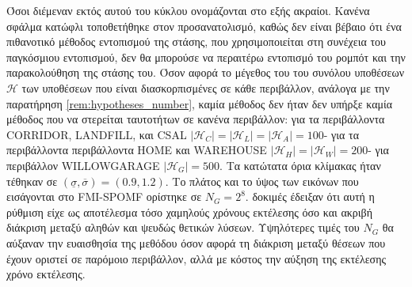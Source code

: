 Όσοι διέμεναν εκτός αυτού του κύκλου ονομάζονται στο εξής ακραίοι.  Κανένα σφάλμα
κατώφλι τοποθετήθηκε στον προσανατολισμό, καθώς δεν είναι βέβαιο ότι ένα πιθανοτικό
μέθοδος εντοπισμού της στάσης, που χρησιμοποιείται στη συνέχεια του παγκόσμιου εντοπισμού, δεν θα μπορούσε να
περαιτέρω εντοπισμό του ρομπότ και την παρακολούθηση της στάσης του.  Όσον αφορά το μέγεθος του
του συνόλου υποθέσεων $\mathcal{H}$ των υποθέσεων που είναι διασκορπισμένες σε κάθε
περιβάλλον, ανάλογα με την παρατήρηση \ref{rem:hypotheses_number}, καμία μέθοδος δεν ήταν
δεν υπήρξε καμία μέθοδος που να στερείται ταυτοτήτων σε κανένα περιβάλλον: για τα περιβάλλοντα CORRIDOR, LANDFILL,
και CSAL $|\mathcal{H}_C| = |\mathcal{H}_L| = |\mathcal{H}_A| = 100$- για τα περιβάλλοντα
περιβάλλοντα HOME και WAREHOUSE $|\mathcal{H}_H| = |\mathcal{H}_W| = 200$- για
περιβάλλον WILLOWGARAGE $|\mathcal{H}_G| = 500$.  Τα κατώτατα όρια κλίμακας ήταν
τέθηκαν σε $(\underline{\sigma}, \overline{\sigma}) = (0.9, 1.2)$. Το πλάτος και το
ύψος των εικόνων που εισάγονται στο FMI-SPOMF ορίστηκε σε $N_G = 2^8$.
δοκιμές έδειξαν ότι αυτή η ρύθμιση είχε ως αποτέλεσμα τόσο χαμηλούς χρόνους εκτέλεσης όσο και
ακριβή διάκριση μεταξύ αληθών και ψευδώς θετικών λύσεων. Υψηλότερες τιμές
του $N_G$ θα αύξαναν την ευαισθησία της μεθόδου όσον αφορά τη διάκριση
μεταξύ θέσεων που έχουν οριστεί σε παρόμοιο περιβάλλον, αλλά με κόστος την αύξηση της εκτέλεσης
χρόνο εκτέλεσης.


